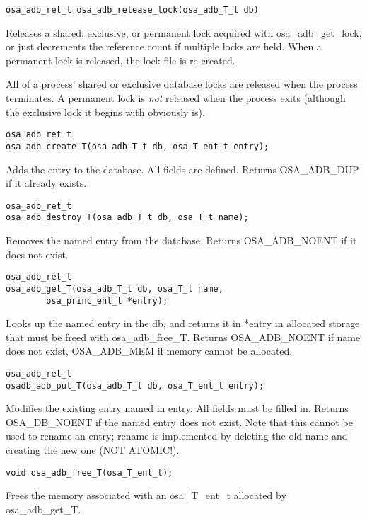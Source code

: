 \begin{verbatim}
osa_adb_ret_t osa_adb_release_lock(osa_adb_T_t db)
\end{verbatim}

Releases a shared, exclusive, or permanent lock acquired with
osa_adb_get_lock, or just decrements the reference count if multiple
locks are held.  When a permanent lock is released, the lock file is
re-created.

All of a process' shared or exclusive database locks are released when
the process terminates.  A permanent lock is {\it not} released when
the process exits (although the exclusive lock it begins with
obviously is).

\begin{verbatim}
osa_adb_ret_t
osa_adb_create_T(osa_adb_T_t db, osa_T_ent_t entry);
\end{verbatim}
%
Adds the entry to the database.  All fields are defined.  Returns
OSA_ADB_DUP if it already exists.

\begin{verbatim}
osa_adb_ret_t
osa_adb_destroy_T(osa_adb_T_t db, osa_T_t name);
\end{verbatim}

Removes the named entry from the database.  Returns OSA_ADB_NOENT if
it does not exist.

\begin{verbatim}
osa_adb_ret_t
osa_adb_get_T(osa_adb_T_t db, osa_T_t name,
        osa_princ_ent_t *entry); 
\end{verbatim}

Looks up the named entry in the db, and returns it in *entry in
allocated storage that must be freed with osa_adb_free_T.  Returns
OSA_ADB_NOENT if name does not exist, OSA_ADB_MEM if memory cannot be
allocated.

\begin{verbatim}
osa_adb_ret_t
osadb_adb_put_T(osa_adb_T_t db, osa_T_ent_t entry);
\end{verbatim}

Modifies the existing entry named in entry.  All fields must be filled
in.  Returns OSA_DB_NOENT if the named entry does not exist.  Note
that this cannot be used to rename an entry; rename is implemented by
deleting the old name and creating the new one (NOT ATOMIC!).

\begin{verbatim}
void osa_adb_free_T(osa_T_ent_t);
\end{verbatim}

Frees the memory associated with an osa_T_ent_t allocated by
osa_adb_get_T.

